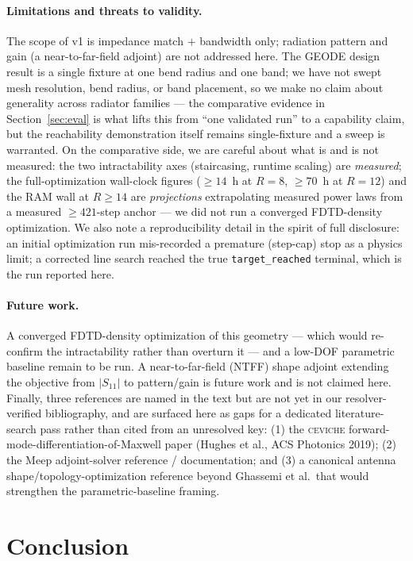\documentclass{anvil-paper}
\begin{document}
\paragraph{Limitations and threats to validity.}
The scope of v1 is impedance match $+$ bandwidth only; radiation pattern and
gain (a near-to-far-field adjoint) are not addressed here. The GEODE design
result is a single fixture at one bend radius and one band; we have not swept
mesh resolution, bend radius, or band placement, so we make no claim about
generality across radiator families --- the comparative evidence in
Section~\ref{sec:eval} is what lifts this from ``one validated run'' to a
capability claim, but the reachability demonstration itself remains
single-fixture and a sweep is warranted. On the comparative side, we are careful
about what is and is not measured: the two intractability axes (staircasing,
runtime scaling) are \emph{measured}; the full-optimization wall-clock figures
($\ge\!14$~h at $R=8$, $\ge\!70$~h at $R=12$) and the RAM wall at $R\!\ge\!14$
are \emph{projections} extrapolating measured power laws from a measured
$\ge\!421$-step anchor --- we did not run a converged FDTD-density optimization.
We also note a reproducibility detail in the spirit of full disclosure: an
initial optimization run mis-recorded a premature (step-cap) stop as a physics
limit; a corrected line search reached the true \texttt{target\_reached}
terminal, which is the run reported here.

\paragraph{Future work.}
A converged FDTD-density optimization of this geometry --- which would re-confirm
the intractability rather than overturn it --- and a low-DOF parametric baseline
remain to be run. A near-to-far-field (NTFF) shape adjoint extending the
objective from $|S_{11}|$ to pattern/gain is future work and is not claimed here.
Finally, three references are named in the text but are not yet in our
resolver-verified bibliography, and are surfaced here as gaps for a dedicated
literature-search pass rather than cited from an unresolved key: (1) the
\textsc{ceviche} forward-mode-differentiation-of-Maxwell paper (Hughes et al.,
ACS Photonics 2019); (2) the Meep adjoint-solver reference / documentation; and
(3) a canonical antenna shape/topology-optimization reference beyond Ghassemi et
al.\ that would strengthen the parametric-baseline framing.

\section{Conclusion}
\label{sec:conclusion}
\end{document}
